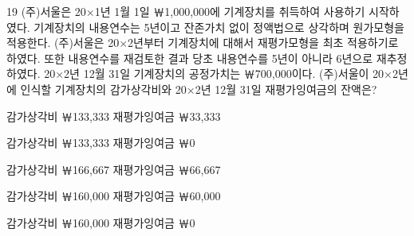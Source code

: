 \begin{question}{19}
(주)서울은 20×1년 1월 1일 ￦1,000,000에 기계장치를 취득하여 사용하기 시작하였다. 기계장치의 내용연수는 5년이고 잔존가치 없이 정액법으로 상각하며 원가모형을 적용한다. (주)서울은 20×2년부터 기계장치에 대해서 재평가모형을 최초 적용하기로 하였다. 또한 내용연수를 재검토한 결과 당초 내용연수를 5년이 아니라 6년으로 재추정하였다. 20×2년 12월 31일 기계장치의 공정가치는 ￦700,000이다. (주)서울이 20×2년에 인식할 기계장치의 감가상각비와 20×2년 12월 31일 재평가잉여금의 잔액은?
\begin{choices}
  \item 감가상각비 ￦133,333 재평가잉여금 ￦33,333
  \item 감가상각비 ￦133,333 재평가잉여금 ￦0
  \item 감가상각비 ￦166,667 재평가잉여금 ￦66,667
  \item 감가상각비 ￦160,000 재평가잉여금 ￦60,000
  \item 감가상각비 ￦160,000 재평가잉여금 ￦0
\end{choices}
\end{question}
